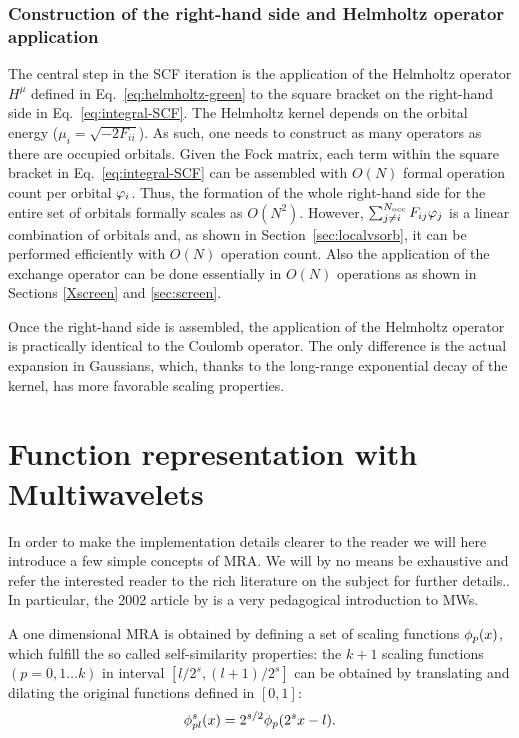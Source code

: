 \documentclass[journal=jctcce, manuscript=article]{achemso}
\begin{document}
\subsubsection{Construction of the right-hand side and Helmholtz operator application}\label{sec:rhs}
The central step in the SCF iteration is the application of the Helmholtz operator $H^{\mu}$ defined in Eq.~\eqref{eq:helmholtz-green} to the square bracket on the right-hand side in Eq.~\eqref{eq:integral-SCF}. The Helmholtz kernel depends on the orbital energy ($\mu_i = \sqrt{-2F_{ii}}$). As such, one needs to construct as many operators as there are occupied orbitals. Given the Fock matrix, each term within the square bracket in Eq.~\eqref{eq:integral-SCF} can be assembled with $O(N)$ formal operation count per orbital $\varphi_i$. Thus, the formation of the whole right-hand side for the entire set of orbitals formally scales as $O(N^{2})$. However, $\sum_{j \ne i}^{N_{\mathrm{occ}}} F_{ij} \varphi_j $ is a linear combination of orbitals and, as shown in Section~\ref{sec:localvsorb}, it can be performed efficiently with $O(N)$ operation count. Also the application of the exchange operator can be done essentially in $O(N)$ operations as shown in Sections \ref{Xscreen} and \ref{sec:screen}.

Once the right-hand side is assembled, the application of the Helmholtz operator is practically identical to the Coulomb operator. The only difference is the actual expansion in Gaussians, which, thanks to the long-range exponential decay of the kernel, has more favorable scaling properties.\cite{Frediani.10.1080/00268976.2013.810793} 

\section{Function representation with Multiwavelets}\label{sec:func_rep}

In order to make the implementation details clearer to the reader we will here introduce a few simple concepts of \ac{MRA}. We will by no means be exhaustive and refer the interested reader to the rich literature on the subject for further details.\cite{Alpert:2002cx,Frediani.10.1080/00268976.2013.810793,Beylkin.10.1002/cpa.3160440202,Bischoff2019-mr}. In particular, the 2002 article by \citeauthor{Alpert:2002cx} is a very pedagogical introduction to \acp{MW}.~\cite{Alpert:2002cx}

A one dimensional \ac{MRA} is obtained by defining a set of scaling functions $\phi_p(x)$, which fulfill the so called self-similarity properties:
the $k+1$ scaling functions $(p=0,1 \ldots k)$ in interval $[l/2^s,(l+1)/2^s]$ can be obtained by translating and dilating the original functions defined in $[0,1]$:
\begin{equation}
    \phi^s_{pl}(x) = 2^{s/2} \phi_p(2^s x - l).
\end{equation}
\end{document}
